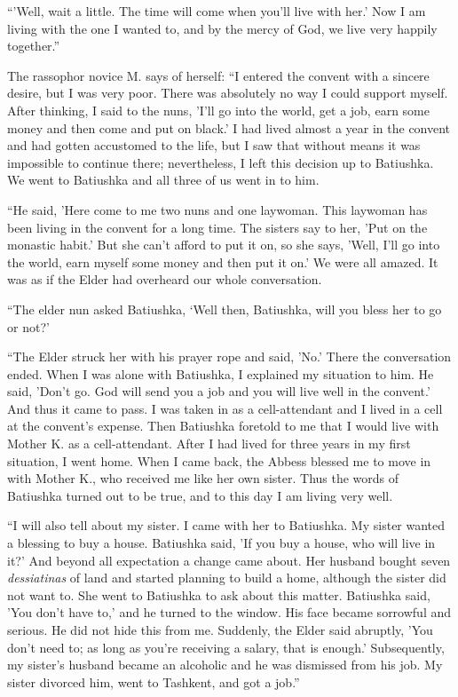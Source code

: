 “'Well, wait a little. The time will come when you'll live with her.' Now I am living with the one I wanted to, and by the mercy of God, we live very happily together.”

The rassophor novice M. says of herself: “I entered the convent with a sincere desire, but I was very poor. There was absolutely no way I could support myself. After thinking, I said to the nuns, 'I'll go into the world, get a job, earn some money and then come and put on black.' I had lived almost a year in the convent and had gotten accustomed to the life, but I saw that without means it was impossible to continue there; nevertheless, I left this decision up to Batiushka. We went to Batiushka and all three of us went in to him.

“He said, 'Here come to me two nuns and one laywoman. This laywoman has been living in the convent for a long time. The sisters say to her, 'Put on the monastic habit.' But she can't afford to put it on, so she says, 'Well, I'll go into the world, earn myself some money and then put it on.' We were all amazed. It was as if the Elder had overheard our whole conversation.

“The elder nun asked Batiushka, ‘Well then, Batiushka, will you bless her to go or not?'

“The Elder struck her with his prayer rope and said, 'No.' There the conversation ended. When I was alone with Batiushka, I explained my situation to him. He said, 'Don't go. God will send you a job and you will live well in the convent.' And thus it came to pass. I was taken in as a cell-attendant and I lived in a cell at the convent's expense. Then Batiushka foretold to me that I would live with Mother K. as a cell-attendant. After I had lived for three years in my first situation, I went home. When I came back, the Abbess blessed me to move in with Mother K., who received me like her own sister. Thus the words of Batiushka turned out to be true, and to this day I am living very well.

“I will also tell about my sister. I came with her to Batiushka. My sister wanted a blessing to buy a house. Batiushka said, 'If you buy a house, who will live in it?' And beyond all expectation a change came about. Her husband bought seven \textit{dessiatinas} of land and started planning to build a home, although the sister did not want to. She went to Batiushka to ask about this matter. Batiushka said, 'You don't have to,' and he turned to the window. His face became sorrowful and serious. He did not hide this from me. Suddenly, the Elder said abruptly, 'You don't need to; as long as you're receiving a salary, that is enough.' Subsequently, my sister's husband became an alcoholic and he was dismissed from his job. My sister divorced him, went to Tashkent, and got a job.”

